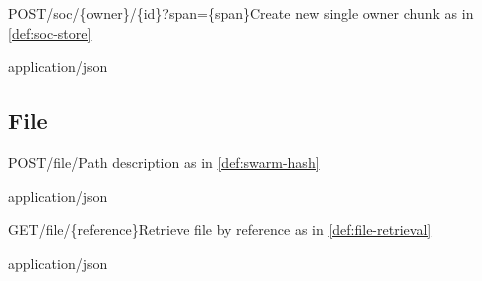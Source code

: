 \begin{apiRoute}{POST}{/soc/\{owner\}/\{id\}?span=\{span\}}{Create new single owner chunk as in \ref{def:soc-store} }
{
}
{ }

\begin{routeParameter} 
\end{routeParameter}
\begin{headerParameter} 
\end{headerParameter}
\begin{queryParameter} 
\end{queryParameter}
\begin{routeResponse}{application/json}
\end{routeResponse}
\end{apiRoute}

\subsection{File \statusgreen}\label{spec:api:file}

\begin{apiRoute}{POST}{/file/}{Path description as in \ref{def:swarm-hash}}
{
}
{ }

\begin{headerParameter} 
\end{headerParameter}
\begin{routeResponse}{application/json}
\end{routeResponse}
\end{apiRoute}




\begin{apiRoute}{GET}{/file/\{reference\}}{Retrieve file by reference as in \ref{def:file-retrieval}}
{
}
{ }

\begin{routeParameter} 
\end{routeParameter}
\begin{routeResponse}{application/json}
\end{routeResponse}
\end{apiRoute}




